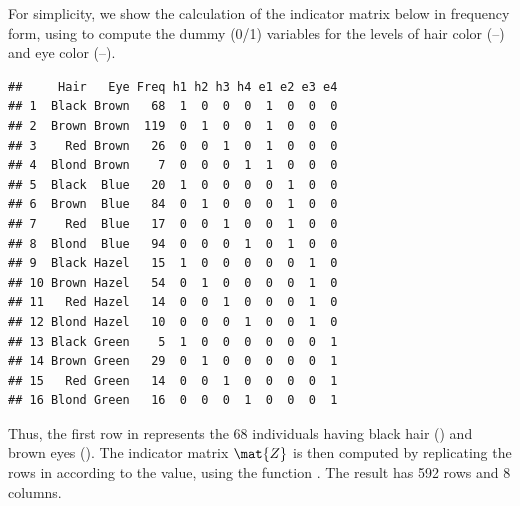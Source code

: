 \documentclass[11pt]{book}
\renewenvironment{knitrout}{\small\renewcommand{\baselinestretch}{.85}}{} %
\begin{document}
For simplicity, we show the calculation of the indicator matrix
below in frequency form, using  to compute the
dummy (0/1) variables
for the levels of hair color (--)
and eye color (--).

\begin{knitrout}
\color{fgcolor}\begin{kframe}
\begin{alltt}
 \hlkwb{<-}  \hlopt{:}\hlstd{)}

 \hlkwb{<-} 
 \hlkwb{<-}  \hlopt{+}\hlopt{$} \hlopt{$}
  \hlkwb{<-} \hlstd{(}\hlstd{,} \hlopt{:}\hlstd{)}
 \hlkwb{<-}  \hlopt{+}\hlopt{$} \hlopt{$}
  \hlkwb{<-} \hlstd{(}\hlstd{,} \hlopt{:}\hlstd{)}

 \hlkwb{<-} 
\end{alltt}
\begin{verbatim}
##     Hair   Eye Freq h1 h2 h3 h4 e1 e2 e3 e4
## 1  Black Brown   68  1  0  0  0  1  0  0  0
## 2  Brown Brown  119  0  1  0  0  1  0  0  0
## 3    Red Brown   26  0  0  1  0  1  0  0  0
## 4  Blond Brown    7  0  0  0  1  1  0  0  0
## 5  Black  Blue   20  1  0  0  0  0  1  0  0
## 6  Brown  Blue   84  0  1  0  0  0  1  0  0
## 7    Red  Blue   17  0  0  1  0  0  1  0  0
## 8  Blond  Blue   94  0  0  0  1  0  1  0  0
## 9  Black Hazel   15  1  0  0  0  0  0  1  0
## 10 Brown Hazel   54  0  1  0  0  0  0  1  0
## 11   Red Hazel   14  0  0  1  0  0  0  1  0
## 12 Blond Hazel   10  0  0  0  1  0  0  1  0
## 13 Black Green    5  1  0  0  0  0  0  0  1
## 14 Brown Green   29  0  1  0  0  0  0  0  1
## 15   Red Green   14  0  0  1  0  0  0  0  1
## 16 Blond Green   16  0  0  0  1  0  0  0  1
\end{verbatim}
\end{kframe}
\end{knitrout}
Thus, the first row in  represents the 68 individuals
having black hair () and brown eyes ().
The indicator matrix $\mat{Z}$ is then computed by replicating the
rows in  according to the  value,
using the function .  The result has 592 rows
and 8 columns.
\end{document}
